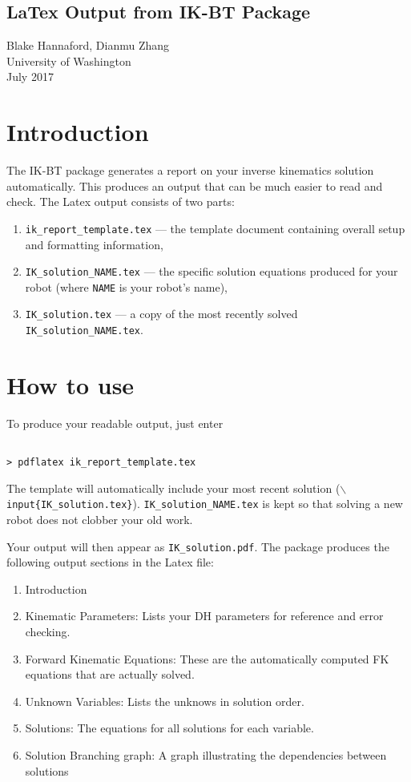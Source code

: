 \documentclass[letterpaper]{article}
\begin{document}
\begin{center}
\section*{LaTex Output from IK-BT Package}
Blake Hannaford, Dianmu Zhang\\
University of Washington\\
July 2017
\end{center}

\section{Introduction}
The IK-BT package generates a report on your inverse kinematics solution automatically.   This produces an output that can be much easier to read and check.   The Latex output consists of two parts:
\begin{enumerate}
    \item {\tt ik\_report\_template.tex} --- the template document containing overall setup and formatting information,
    \item {\tt IK\_solution\_NAME.tex}  --- the specific solution equations produced for your robot (where {\tt NAME} is your robot's name), 
    \item {\tt IK\_solution.tex} --- a copy of the most recently solved {\tt IK\_solution\_NAME.tex}.
\end{enumerate}

\section{How to use}
To produce your readable output, just enter
\begin{verbatim}

> pdflatex ik_report_template.tex

\end{verbatim}
The template will automatically include your most recent solution ({\tt $\backslash$input\{IK\_solution.tex\}}).  {\tt IK\_solution\_NAME.tex} is kept so that solving a new robot does not clobber your old work. 

Your output will then appear as {\tt IK\_solution.pdf}.   
The package produces the following output sections in the Latex file:


\begin{enumerate}
    \item Introduction
    \item Kinematic Parameters:
    Lists your DH parameters for reference and error checking.
    \item Forward Kinematic Equations:
    These are the automatically computed FK equations that are actually solved. 
    \item Unknown Variables:
    Lists the unknows in solution order. 
    \item Solutions:
    The equations for all solutions for each variable. 
    \item Solution Branching graph:
    A graph illustrating the dependencies between solutions
    
\end{enumerate}
\end{document}
